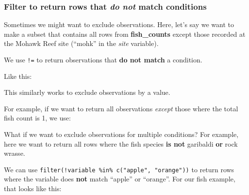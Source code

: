 \documentclass[]{book}
\newenvironment{Shaded}{\begin{snugshade}}{\end{snugshade}}
\newcommand{\DecValTok}[1]{\textcolor[rgb]{0.00,0.00,0.81}{#1}}
\newcommand{\KeywordTok}[1]{\textcolor[rgb]{0.13,0.29,0.53}{\textbf{#1}}}
\newcommand{\NormalTok}[1]{#1}
\newcommand{\OperatorTok}[1]{\textcolor[rgb]{0.81,0.36,0.00}{\textbf{#1}}}
\newcommand{\StringTok}[1]{\textcolor[rgb]{0.31,0.60,0.02}{#1}}
\begin{document}
\hypertarget{filter-to-return-rows-that-do-not-match-conditions}{%
\subsubsection{\texorpdfstring{Filter to return rows that \emph{do not} match conditions}{Filter to return rows that do not match conditions}}\label{filter-to-return-rows-that-do-not-match-conditions}}

Sometimes we might want to exclude observations. Here, let's say we want to make a subset that contains all rows from \textbf{fish\_counts} except those recorded at the Mohawk Reef site (``mohk'' in the \emph{site} variable).

We use \texttt{!=} to return observations that \textbf{do not match} a condition.

Like this:

\begin{Shaded}
\end{Shaded}

This similarly works to exclude observations by a value.

For example, if we want to return all observations \emph{except} those where the total fish count is 1, we use:

\begin{Shaded}
\end{Shaded}

What if we want to exclude observations for multiple conditions? For example, here we want to return all rows where the fish species \textbf{is not} garibaldi \textbf{or} rock wrasse.

We can use \texttt{filter(!variable\ \%in\%\ c("apple",\ "orange"))} to return rows where the variable does \textbf{not} match ``apple'' or ``orange''. For our fish example, that looks like this:
\end{document}
